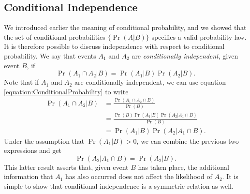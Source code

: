 \subsection{Conditional Independence}

We introduced earlier the meaning of conditional probability, and we showed that the set of conditional probabilities $\{ \Pr (A|B) \}$ specifies a valid probability law.
It is therefore possible to discuss independence with respect to conditional probability.
We say that events $A_1$ and $A_2$ are \emph{conditionally independent}, given event $B$, if 
\begin{equation*}
\Pr (A_1 \cap A_2 | B) = \Pr (A_1 | B) \Pr (A_2 | B) .
\end{equation*}
Note that if $A_1$ and $A_2$ are conditionally independent, we can use equation \eqref{equation:ConditionalProbability} to write
\begin{equation*}
\begin{split}
\Pr (A_1 \cap A_2 | B) &= \frac{ \Pr (A_1 \cap A_2 \cap  B) }{\Pr (B)} \\
&= \frac{ \Pr (B) \Pr (A_1 | B) \Pr (A_2 | A_1 \cap  B) }{\Pr (B)} \\
&= \Pr (A_1 | B) \Pr (A_2 | A_1 \cap  B) .
\end{split}
\end{equation*}
Under the assumption that $\Pr (A_1 | B) > 0$, we can combine the previous two expressions and get
\begin{equation*}
\Pr (A_2 | A_1 \cap  B) = \Pr (A_2 | B) .
\end{equation*}
This latter result asserts that, given event $B$ has taken place, the additional information that $A_1$ has also occurred does not affect the likelihood of $A_2$.
It is simple to show that conditional independence is a symmetric relation as well.


